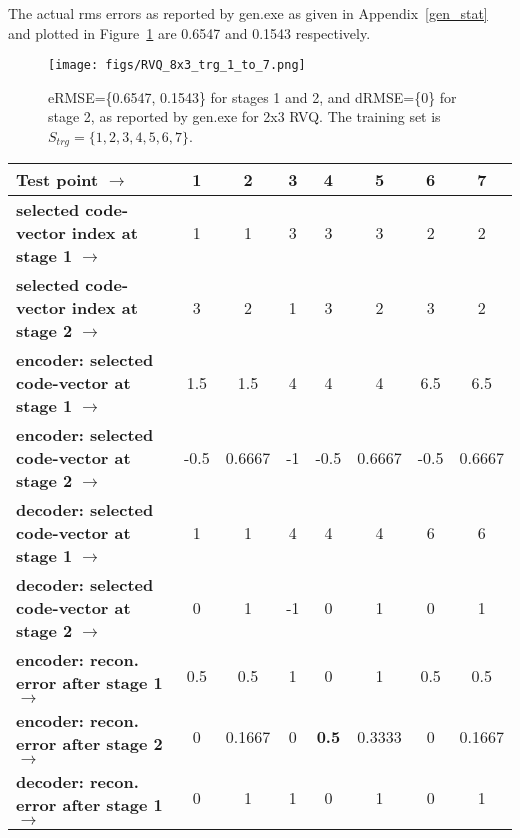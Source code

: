 The actual rms errors as reported by gen.exe as given in Appendix~\ref{gen_stat} and plotted in Figure~\ref{fig:RVQ_8x3_trg_1_to_7} are 0.6547 and 0.1543 respectively.


\begin{figure}
\centering
\texttt{[image: figs/RVQ\_8x3\_trg\_1\_to\_7.png]}
\caption{eRMSE=\{0.6547, 0.1543\} for stages 1 and 2, and dRMSE=\{0\} for stage 2, as reported by gen.exe for 2x3 RVQ.  The training set is $S_{trg}=\{1,2,3,4,5,6,7\}$.}
\label{fig:RVQ_8x3_trg_1_to_7}
\end{figure}


\begin{table}[t]
\centering
\begin{tabular}{|l||c|c|c|c|c|c|c|}\hline 
\textbf{Test point} $\rightarrow$                             & \textbf{1}  &\textbf{2} &\textbf{3}   &\textbf{4}   &\textbf{5} &\textbf{6} &\textbf{7} \\\hline
\textbf{selected code-vector index at stage 1} $\rightarrow$ & 1     &  1   &  3   &  3   &  3   &  2     & 2 \\
\textbf{selected code-vector index at stage 2} $\rightarrow$ & 3     & 2     & 1   &  3   &  2   &  3     & 2 \\\hline
\textbf{encoder: selected code-vector at stage 1} $\rightarrow$& 1.5     &1.5           &  4   &  4           &  4             &  6.5     & 6.5 \\
\textbf{encoder: selected code-vector at stage 2} $\rightarrow$& -0.5     & 0.6667     & -1   &  -0.5       &  0.6667   &  -0.5     & 0.6667 \\\hline
\textbf{decoder: selected code-vector at stage 1} $\rightarrow$& 1     &1           &  4   &  4           &  4             &  6     & 6 \\
\textbf{decoder: selected code-vector at stage 2} $\rightarrow$& 0     & 1     & -1   &  0       &  1   &  0     & 1 \\\hline
\textbf{encoder: recon. error after stage 1} $\rightarrow$& \color{blue}0.5  & \color{blue}0.5   &  \color{blue}1     &   0   &   \color{blue}1   &   \color{blue}0.5 & \color{blue}0.5 \\
\textbf{encoder: recon. error after stage 2} $\rightarrow$ & 0   &  \color{darkgreen}0.1667     &  0   &\color{darkgreen}\textbf{0.5}&   \color{darkgreen}0.3333    &   0   & \color{darkgreen}0.1667 \\\hline
\textbf{decoder: recon. error after stage 1} $\rightarrow$        & 0       & 1     & 1   & 0         &  1   &  0         & 1 \\

\end{tabular}
\end{table}
